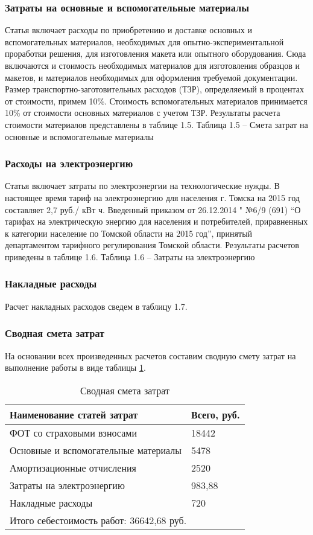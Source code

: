 \subsubsection{Затраты на основные и вспомогательные материалы}
Статья включает расходы по приобретению и доставке основных и вспомогательных материалов, необходимых для опытно-экспериментальной проработки решения, для изготовления макета или опытного оборудования. Сюда включаются и стоимость необходимых материалов для изготовления образцов и макетов, и материалов необходимых для оформления требуемой документации. 
Размер транспортно-заготовительных расходов (ТЗР), определяемый в процентах от стоимости, примем 10\%. Стоимость вспомогательных материалов принимается 10\% от стоимости основных материалов с учетом ТЗР. Результаты расчета стоимости материалов представлены в таблице 1.5.
Таблица 1.5 – Смета затрат на основные и вспомогательные материалы
\subsubsection{Расходы на электроэнергию}
Статья включает затраты по электроэнергии на технологические нужды. В настоящее время тариф на электроэнергию для населения г. Томска на 2015 год составляет 2,7 руб./ кВт ч. Введенный приказом от 26.12.2014 " №6/9 (691) ``О тарифах на электрическую энергию для населения и потребителей, приравненных к категории население по Томской области на 2015 год'', принятый департаментом тарифного регулирования Томской области.
Результаты расчетов приведены в таблице 1.6.
Таблица 1.6 – Затраты на электроэнергию
\subsubsection{Накладные расходы}
Расчет накладных расходов сведем в таблицу 1.7.
\subsubsection{Сводная смета затрат}
На основании всех произведенных расчетов составим сводную смету затрат на выполнение работы в виде таблицы \ref{tab:cmeta_zat}.

\begin{longtable}[h!]{|*2{m{}|}}
\caption{Сводная смета затрат}
\label{tab:cmeta_zat}
\hline
Наименование статей затрат                 & Всего, руб.       \\ \hline
ФОТ со страховыми взносами                 & 18442             \\ \hline
Основные и вспомогательные материалы       & 5478              \\ \hline
Амортизационные отчисления                 & 2520              \\ \hline
Затраты на электроэнергию                  & 983,88            \\ \hline
Накладные расходы                          & 720               \\ \hline
\multicolumn{2}{|l|}{Итого себестоимость работ: 36642,68 руб.} \\ \hline
\end{longtable}

